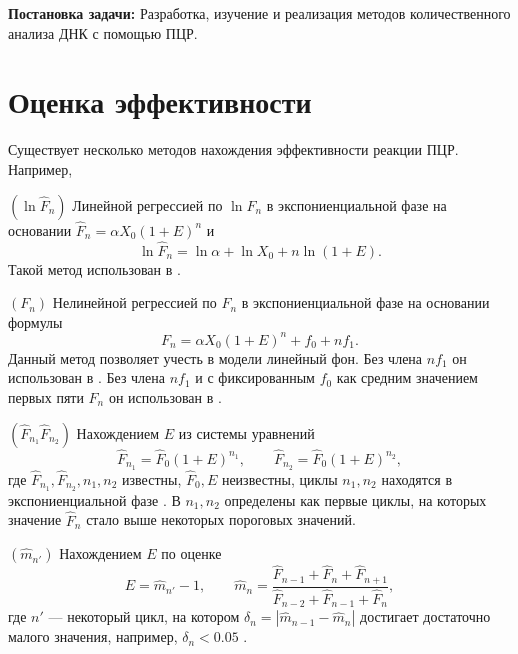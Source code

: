  {\bf Постановка задачи:} Разработка, изучение и реализация методов
количественного анализа ДНК с помощью ПЦР.

\section{Оценка эффективности}\label{sec:eff}

Существует несколько методов нахождения эффективности реакции ПЦР. Например,
\begin{labeldesc}
  \item[$(\ln\hat F_{n})$]\label{item:method_log}
  Линейной регрессией по $\ln\hat F_{n}$ в экспониенциальной фазе на
  основании $\hat F_{n}=\alpha X_0(1+E)^{n}$ и
  \[
    \ln \hat F_{n}=\ln\alpha + \ln X_0+n\ln(1+E).
  \]
  Такой метод использован в
  \cite{wiesnerCountingTargetMolecules1992,ramakersAssumptionfreeAnalysisQuantitative2003}.

  \item[$(F_{n})$]\label{item:method_lin}
  Нелинейной регрессией по $F_{n}$ в экспониенциальной фазе на основании
  формулы
  \[
    F_{n}=\alpha X_0(1+E)^{n}+f_0+nf_1.
  \]
  Данный метод позволяет учесть в модели линейный фон. Без члена $nf_1$ он
  использован в \cite{tichopadStandardizedDeterminationRealtime2003}. Без
  члена $nf_1$ и с фиксированным $f_0$ как средним значением первых пяти
  $F_{n}$ он использован в \cite{barKineticOutlierDetection2003}.

  \item[$(\hat F_{n_1}\hat F_{n_2})$]\label{item:method_sys}
  Нахождением $E$ из системы уравнений
  \[
    \hat F_{n_1}=\hat F_0(1+E)^{n_1},\qquad \hat F_{n_2}=\hat F_0(1+E)^{n_2},
  \]
  где $\hat F_{n_1},\hat F_{n_2},n_1,n_2$ известны, $\hat F_0,E$ неизвестны,
  циклы $n_1,n_2$ находятся в экспониенциальной фазе
  \cite{liuNewQuantitativeMethod2002}. В \cite{liuNewQuantitativeMethod2002}
  $n_1,n_2$ определены как первые циклы, на которых значение $\hat F_{n}$ стало
  выше некоторых пороговых значений.

  \item[$(\hat m_{n'})$]\label{item:method_estimate}
  Нахождением $E$ по оценке
  \[
    E=\hat m_{n'}-1,\qquad
    \hat m_{n}=\frac{\hat F_{n-1}+\hat F_{n}+\hat F_{n+1}}
    {\hat F_{n-2}+\hat F_{n-1}+\hat F_{n}},
  \]
  где $n'$ --- некоторый цикл, на котором
  $\delta_{n}=|\hat m_{n-1}-\hat m_{n}|$ достигает достаточно малого значения,
  например, $\delta_{n}<0.05$ \cite{peccoudStatisticalEstimationsPCR1998}.


\end{labeldesc}
